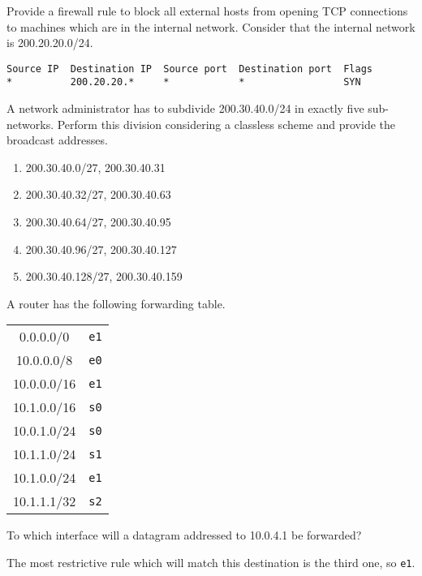 \begin{Exercise}
Provide a firewall rule to block all external hosts from opening TCP connections to machines which are in the internal network.
Consider that the internal network is 200.20.20.0/24.
\end{Exercise}
\begin{Answer}
\begin{verbatim}
Source IP  Destination IP  Source port  Destination port  Flags
*          200.20.20.*     *            *                 SYN
\end{verbatim}
\end{Answer}

\begin{Exercise}
A network administrator has to subdivide 200.30.40.0/24 in exactly five sub-networks.
Perform this division considering a classless scheme and provide the broadcast addresses.
\end{Exercise}
\begin{Answer}
\begin{enumerate}
\item 200.30.40.0/27, 200.30.40.31
\item 200.30.40.32/27, 200.30.40.63
\item 200.30.40.64/27, 200.30.40.95
\item 200.30.40.96/27, 200.30.40.127
\item 200.30.40.128/27, 200.30.40.159
\end{enumerate}
\end{Answer}

\begin{Exercise}
A router has the following forwarding table.
\begin{center}
\begin{tabular}{c|c}
0.0.0.0/0 & \texttt{e1} \\
10.0.0.0/8 & \texttt{e0} \\
10.0.0.0/16 & \texttt{e1} \\
10.1.0.0/16 & \texttt{s0} \\
10.0.1.0/24 & \texttt{s0} \\
10.1.1.0/24 & \texttt{s1} \\
10.1.0.0/24 & \texttt{e1} \\
10.1.1.1/32 & \texttt{s2}
\end{tabular}
\end{center}

To which interface will a datagram addressed to 10.0.4.1 be forwarded?
\end{Exercise}
\begin{Answer}
The most restrictive rule which will match this destination is the third one, so \texttt{e1}.
\end{Answer}

